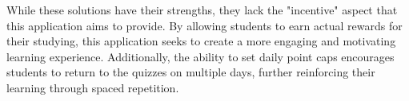 While these solutions have their strengths, they lack the "incentive" aspect that this application aims to provide. By allowing students to earn actual rewards for their studying, this application seeks to create a more engaging and motivating learning experience. Additionally, the ability to set daily point caps encourages students to return to the quizzes on multiple days, further reinforcing their learning through spaced repetition.
